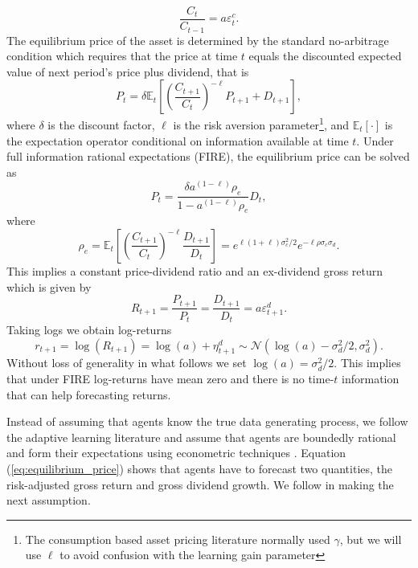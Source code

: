 \documentclass[11pt]{article}
\begin{document}
\begin{equation}
    \frac{C_t}{C_{t-1}} = a \varepsilon^c_t.
\end{equation}
The equilibrium price of the asset is determined by the standard no-arbitrage condition which requires that the price at time $t$ equals the discounted expected value of next period's price plus dividend, that is
\begin{equation}\label{eq:equilibrium_price}
    P_t = \delta \mathbb{E}_t \left[{ \left(\frac{C_{t+1}}{C_t}\right)^{- \ell} P_{t+1} + D_{t+1}}\right],
\end{equation}
where $\delta$ is the discount factor, $\ell$ is the risk aversion parameter\footnote{The consumption based asset pricing literature normally used $\gamma$, but we will use $\ell$ to avoid confusion with the learning gain parameter}, and $\mathbb{E}_t[\cdot]$ is the expectation operator conditional on information available at time $t$.
Under full information rational expectations (FIRE), the equilibrium price can be solved as
\begin{equation}
    P_t =  \frac{\delta a^{(1 - \ell)} \rho_e}{1 - a^{(1 - \ell)} \rho_e} D_t,
\end{equation}
where 
\begin{equation}
    \rho_e = \mathbb{E}_t \left[\left( \frac{C_{t+1}}{C_t}\right)^{- \ell} \frac{D_{t+1}}{D_t} \right] = e ^ {\ell(1 + \ell) \sigma^2_c/2} e ^ {-\ell \rho \sigma_c \sigma_d} .
\end{equation}
This implies a constant price-dividend ratio and an ex-dividend gross return which is given by
\begin{equation}
    R_{t+1} = \frac{P_{t+1}}{P_t} = \frac{D_{t+1}}{D_t} = a \varepsilon^d_{t+1}.
\end{equation}
Taking logs we obtain log-returns
\begin{equation}
    r_{t+1} = \log(R_{t+1}) = \log(a) + \eta^d_{t+1} \sim \mathcal{N}(\log(a) - \sigma^2_d/2, \sigma^2_d).
\end{equation}
Without loss of generality in what follows we set $\log(a) = \sigma^2_d/2$. This implies that under FIRE log-returns have mean zero and there is no time-$t$ information that can help forecasting returns.

Instead of assuming that agents know the true data generating process, we follow the adaptive learning literature and assume that agents are boundedly rational and form their expectations using econometric techniques \citep{GeorgeWEvans2001}.
Equation (\ref{eq:equilibrium_price}) shows that agents have to forecast two quantities, the risk-adjusted gross return and gross dividend growth.
We follow \cite{Adam2016} in making the next assumption.
\end{document}
